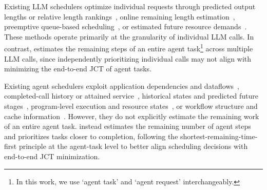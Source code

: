 

Existing LLM schedulers optimize individual requests through predicted output lengths or relative length rankings~\citep{SSJF,LTR}, online remaining length estimation~\citep{TRAIL}, preemptive queue-based scheduling~\citep{FastServe}, or %
estimated future resource demands~\citep{Past-Future,JITServe}. These methods operate primarily at the granularity of individual LLM calls. In contrast, \sysname estimates the remaining steps of an entire agent task\footnote{In this work, we use `agent task' and `agent request' interchangeably.} across multiple LLM calls, since independently prioritizing individual calls may not align with minimizing the end-to-end JCT of agent tasks.

Existing agent schedulers exploit application dependencies and dataflows~\citep{Parrot}, completed-call history or attained service~\citep{Agentix}, historical states and predicted future stages~\citep{Astraea}, program-level execution and resource states~\citep{ThunderAgent}, or workflow structure and cache information~\citep{Helium}. However, they do not explicitly estimate the remaining work of an entire agent task. \sysname instead estimates the remaining number of agent steps and prioritizes tasks closer to completion, following the shortest-remaining-time-first principle at the agent-task level to better align scheduling decisions with end-to-end JCT minimization.

